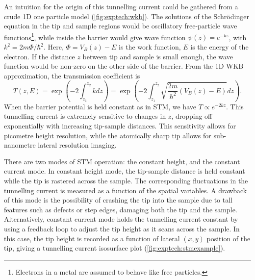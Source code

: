 \sloppy An intuition for the origin of this tunnelling current could be gathered from a crude \ac{1D} one particle model (\autoref{fig:exptech:wkb}). The solutions of the Schr\"odinger equation in the tip and sample regions would be oscillatory free-particle wave functions\footnote{Electrons in a metal are assumed to behave like free particles.}, while inside the barrier would give wave function $\psi(z) = e^{-kz}$, with $k^2 = 2m\Phi/\hbar^2$. Here, $\Phi = V_B(z) - E$ is the work function, $E$ is the energy of the electron. If the distance $z$ between tip and sample is small enough, the wave function would be non-zero on the other side of the barrier. From the \ac{1D} \ac{WKB} approximation, the transmission coefficient is
\begin{equation} \label{eq:exptech:transfcn}
T(z,E) = \exp{\left(-2\int_{z_1} ^{z_2} k dz \right)} = \exp{\left(-2  \int_{z_1}^{z_2} \sqrt{\frac{2m}{\hbar^2}(V_B(z) - E)} dz \right)}.
\end{equation}
When the barrier potential  is held constant as in \ac{STM}, we have $T \propto e^{-2kz}$. This tunnelling current is extremely sensitive to changes in $z$, dropping off exponentially with increasing tip-sample distances. This sensitivity allows for picometre height resolution, while the atomically sharp tip allows for sub-nanometre lateral resolution imaging.


\begin{figure} [h]
    \centering
    \caption{}
    \label{fig:exptech:wkb}
\end{figure}


There are two modes of \ac{STM} operation: the constant height, and the constant current mode. In constant height mode, the tip-sample distance is held constant while the tip is rastered across the sample. The corresponding fluctuations in the tunnelling current is measured as a function of the spatial variables. A drawback of this mode is the possibility of crashing the tip into the sample due to tall features such as defects or step edges, damaging both the tip and the sample. Alternatively, constant current mode holds the tunnelling current constant by using a feedback loop to adjust the tip height as it scans across the sample. In this case, the tip height is recorded as a function of lateral $(x,y)$ position of the tip, giving a tunnelling current isosurface plot (\autoref{fig:exptech:stmexample}).

